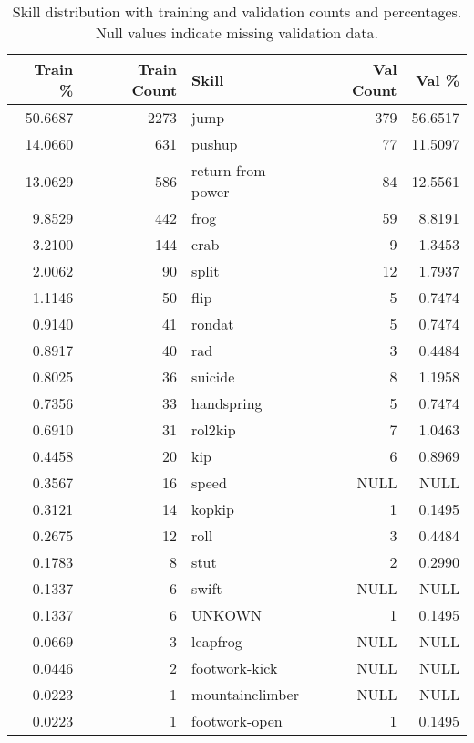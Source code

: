 \begin{table}[h!]
    \centering
    \begin{tabular}{|r|r|l|r|r|}
        \hline
        \textbf{Train \%} & \textbf{Train Count} & \textbf{Skill} & \textbf{Val Count} & \textbf{Val \%} \\
        \hline
        50.6687 & 2273 & jump & 379 & 56.6517 \\
        14.0660 & 631 & pushup & 77 & 11.5097 \\
        13.0629 & 586 & return from power & 84 & 12.5561 \\
        9.8529 & 442 & frog & 59 & 8.8191 \\
        3.2100 & 144 & crab & 9 & 1.3453 \\
        2.0062 & 90 & split & 12 & 1.7937 \\
        1.1146 & 50 & flip & 5 & 0.7474 \\
        0.9140 & 41 & rondat & 5 & 0.7474 \\
        0.8917 & 40 & rad & 3 & 0.4484 \\
        0.8025 & 36 & suicide & 8 & 1.1958 \\
        0.7356 & 33 & handspring & 5 & 0.7474 \\
        0.6910 & 31 & rol2kip & 7 & 1.0463 \\
        0.4458 & 20 & kip & 6 & 0.8969 \\
        0.3567 & 16 & speed & NULL & NULL \\
        0.3121 & 14 & kopkip & 1 & 0.1495 \\
        0.2675 & 12 & roll & 3 & 0.4484 \\
        0.1783 & 8 & stut & 2 & 0.2990 \\
        0.1337 & 6 & swift & NULL & NULL \\
        0.1337 & 6 & UNKOWN & 1 & 0.1495 \\
        0.0669 & 3 & leapfrog & NULL & NULL \\
        0.0446 & 2 & footwork-kick & NULL & NULL \\
        0.0223 & 1 & mountainclimber & NULL & NULL \\
        0.0223 & 1 & footwork-open & 1 & 0.1495 \\
        \hline
    \end{tabular}
    \caption{Skill distribution with training and validation counts and percentages. Null values indicate missing validation data.}
    \label{tab:skill_distribution_full_with_nulls}
\end{table}


